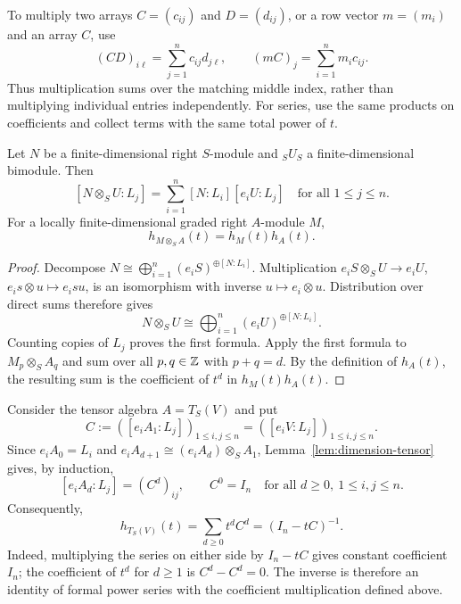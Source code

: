 To multiply two arrays $C=(c_{ij})$ and $D=(d_{ij})$, or a row vector $m=(m_i)$ and an array $C$, use
\[
(CD)_{i\ell}=\sum_{j=1}^n c_{ij}d_{j\ell},
\qquad (mC)_j=\sum_{i=1}^n m_i c_{ij}.
\]
Thus multiplication sums over the matching middle index, rather than multiplying individual entries independently.
For series, use the same products on coefficients and collect terms with the same total power of $t$.

\begin{lemma}\label{lem:dimension-tensor}\label{lem:hilbert-tensor}
Let $N$ be a finite-dimensional right $S$-module and ${}_SU_S$ a finite-dimensional bimodule.
Then
\[
[N\otimes_S U:L_j]
=\sum_{i=1}^n[N:L_i][e_iU:L_j]
\quad\text{for all }1\leq j\leq n.
\]
For a locally finite-dimensional graded right $A$-module $M$,
\[
h_{M\otimes_S A}(t)=h_M(t)h_A(t).
\]
\end{lemma}

\begin{supplementary}
\begin{proof}
Decompose $N\cong\bigoplus_{i=1}^n(e_iS)^{\oplus[N:L_i]}$.
Multiplication $e_iS\otimes_S U\to e_iU$, $e_is\otimes u\mapsto e_isu$, is an isomorphism with inverse $u\mapsto e_i\otimes u$.
Distribution over direct sums therefore gives
\[
N\otimes_S U\cong\bigoplus_{i=1}^n(e_iU)^{\oplus[N:L_i]}.
\]
Counting copies of $L_j$ proves the first formula.
Apply the first formula to $M_p\otimes_S A_q$ and sum over all $p,q\in\mathbb{Z}$ with $p+q=d$.
By the definition of $h_A(t)$, the resulting sum is the coefficient of $t^d$ in $h_M(t)h_A(t)$.
\end{proof}
\end{supplementary}

\begin{example}\label{ex:hilbert-tensor-algebra}
Consider the tensor algebra $A=T_S(V)$ and put 
\[C:=([e_iA_1:L_j])_{1\leq i,j\leq n}=([e_iV:L_j])_{1\leq i,j\leq n}.\]
Since $e_iA_0=L_i$ and $e_iA_{d+1}\cong(e_iA_d)\otimes_S A_1$, Lemma~\ref{lem:dimension-tensor} gives, by induction,
\[
[e_iA_d:L_j]=(C^d)_{ij},
\qquad C^0=I_n
\quad\text{for all }d\geq0,\ 1\leq i,j\leq n.
\]
Consequently,
\begin{equation}\label{eq:hilbert-tensor-algebra}
\boxed{\displaystyle
h_{T_S(V)}(t)=\sum_{d\geq0}t^dC^d=(I_n-tC)^{-1}.}
\end{equation}
Indeed, multiplying the series on either side by $I_n-tC$ gives constant coefficient $I_n$; the coefficient of $t^d$ for $d\geq1$ is $C^d-C^d=0$.
The inverse is therefore an identity of formal power series with the coefficient multiplication defined above.
\end{example}

